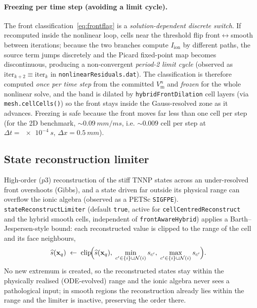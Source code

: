 \documentclass[11pt,a4paper]{article}
\newcommand{\code}[1]{\texttt{\small #1}}
\newcommand{\Vm}{V_{\text{m}}}
\newcommand{\Iion}{I_{\mathrm{ion}}}
\newcommand{\dictkey}[1]{\textcolor{black!60!green}{\texttt{\footnotesize #1}}}
\begin{document}
\paragraph{Freezing per time step (avoiding a limit cycle).}
The front classification~\eqref{eq:frontflag} is a \emph{solution-dependent
discrete switch}. If recomputed inside the nonlinear loop, cells near the
threshold flip front$\leftrightarrow$smooth between iterations; because the two
branches compute $\Iion$ by different paths, the source term jumps discretely
and the Picard fixed-point map becomes discontinuous, producing a non-convergent
\emph{period-2 limit cycle} (observed as $\text{iter}_{k+2}\equiv\text{iter}_k$
in \code{nonlinearResiduals.dat}). The classification is therefore computed
\emph{once per time step} from the committed $\Vm^{n}$ and \emph{frozen} for the
whole nonlinear solve, and the band is dilated by \dictkey{hybridFrontDilation}
cell layers (via \code{mesh.cellCells()}) so the front stays inside the
Gauss-resolved zone as it advances. Freezing is safe because the front moves far
less than one cell per step (for the 2D benchmark, $\sim\!\SI{0.09}{mm/ms}$, i.e.
$\sim\!0.009$ cell per step at $\Delta t=\SI{e-4}{s}$, $\Delta x=\SI{0.5}{mm}$).

\subsection{State reconstruction limiter}
\label{sec:limiter}

High-order ($p3$) reconstruction of the stiff TNNP states across an
under-resolved front overshoots (Gibbs), and a state driven far outside its
physical range can overflow the ionic algebra (observed as a PETSc
\code{SIGFPE}). \dictkey{stateReconstructLimiter} (default \code{true}, active
for \code{cellCentredReconstruct} and the hybrid smooth cells, independent of
\dictkey{frontAwareHybrid}) applies a Barth--Jespersen-style bound: each
reconstructed value is clipped to the range of the cell and its face neighbours,
\begin{equation}
  \widehat{s}(\mathbf{x}_q)
  \;\leftarrow\;
  \mathrm{clip}\!\Bigl(\widehat{s}(\mathbf{x}_q),\;
     \min_{c'\in\{i\}\cup\mathcal{N}(i)} s_{c'},\;
     \max_{c'\in\{i\}\cup\mathcal{N}(i)} s_{c'}\Bigr).
  \label{eq:limiter}
\end{equation}
No new extremum is created, so the reconstructed states stay within the
physically realised (ODE-evolved) range and the ionic algebra never sees a
pathological input; in smooth regions the reconstruction already lies within the
range and the limiter is inactive, preserving the order there.
\end{document}
